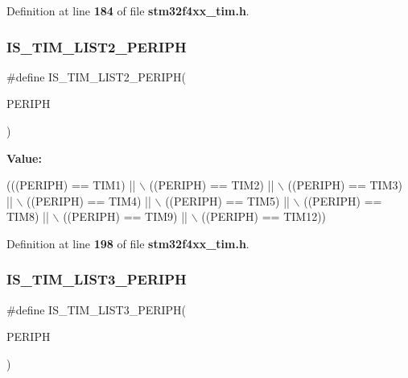 Definition at line \textbf{ 184} of file \textbf{ stm32f4xx\+\_\+tim.\+h}.

\mbox{\label{group__TIM__Exported__constants_ga3c489ac3294f0d8f2ec097da909bc8e0}} 
\subsubsection{I\+S\+\_\+\+T\+I\+M\+\_\+\+L\+I\+S\+T2\+\_\+\+P\+E\+R\+I\+PH}
{\footnotesize\ttfamily \#define I\+S\+\_\+\+T\+I\+M\+\_\+\+L\+I\+S\+T2\+\_\+\+P\+E\+R\+I\+PH(\begin{DoxyParamCaption}\item[{}]{P\+E\+R\+I\+PH }\end{DoxyParamCaption})}

{\bfseries Value\+:}
\begin{DoxyCode}
(((PERIPH) == TIM1) || \(\backslash\)
                                     ((PERIPH) == TIM2) || \(\backslash\)
                                     ((PERIPH) == TIM3) || \(\backslash\)
                                     ((PERIPH) == TIM4) || \(\backslash\)
                                     ((PERIPH) == TIM5) || \(\backslash\)
                                     ((PERIPH) == TIM8) || \(\backslash\)
                                     ((PERIPH) == TIM9) || \(\backslash\)
                                     ((PERIPH) == TIM12))
\end{DoxyCode}


Definition at line \textbf{ 198} of file \textbf{ stm32f4xx\+\_\+tim.\+h}.

\mbox{\label{group__TIM__Exported__constants_ga2d80541c542755ac3f2aca078bd98adb}} 
\subsubsection{I\+S\+\_\+\+T\+I\+M\+\_\+\+L\+I\+S\+T3\+\_\+\+P\+E\+R\+I\+PH}
{\footnotesize\ttfamily \#define I\+S\+\_\+\+T\+I\+M\+\_\+\+L\+I\+S\+T3\+\_\+\+P\+E\+R\+I\+PH(\begin{DoxyParamCaption}\item[{}]{P\+E\+R\+I\+PH }\end{DoxyParamCaption})}

